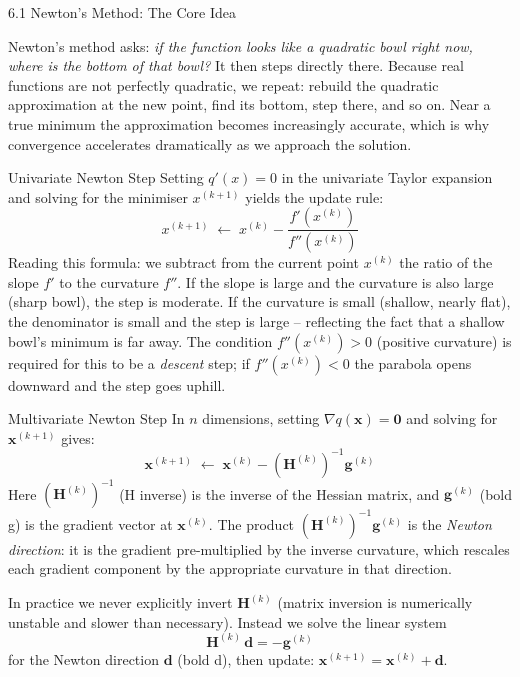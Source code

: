 \documentclass[aspectratio=169,10pt]{beamer}
\newcommand{\xbf}{\mathbf{x}}
\newcommand{\gbf}{\mathbf{g}}
\newcommand{\Hbf}{\mathbf{H}}
\begin{document}
\begin{frame}[allowframebreaks]{6.1 Newton's Method: The Core Idea}

  Newton's method asks: \emph{if the function looks like a quadratic bowl right
  now, where is the bottom of that bowl?}  It then steps directly there.  Because
  real functions are not perfectly quadratic, we repeat: rebuild the quadratic
  approximation at the new point, find its bottom, step there, and so on.  Near a
  true minimum the approximation becomes increasingly accurate, which is why
  convergence accelerates dramatically as we approach the solution.

  \begin{block}{Univariate Newton Step}
    Setting $q'(x) = 0$ in the univariate Taylor expansion and solving for the
    minimiser $x^{(k+1)}$ yields the update rule:
    \[
      x^{(k+1)} \;\leftarrow\; x^{(k)} - \frac{f'\!\left(x^{(k)}\right)}{f''\!\left(x^{(k)}\right)}
    \]
    Reading this formula: we subtract from the current point $x^{(k)}$ the ratio
    of the slope $f'$ to the curvature $f''$.  If the slope is large and the
    curvature is also large (sharp bowl), the step is moderate.  If the curvature
    is small (shallow, nearly flat), the denominator is small and the step is
    large -- reflecting the fact that a shallow bowl's minimum is far away.
    The condition $f''(x^{(k)}) > 0$ (positive curvature) is required for this
    to be a \emph{descent} step; if $f''(x^{(k)}) < 0$ the parabola opens
    downward and the step goes uphill.
  \end{block}

  \begin{block}{Multivariate Newton Step}
    In $n$ dimensions, setting $\nabla q(\xbf) = \mathbf{0}$ and solving for
    $\xbf^{(k+1)}$ gives:
    \[
      \xbf^{(k+1)} \;\leftarrow\; \xbf^{(k)} - \left(\Hbf^{(k)}\right)^{-1} \gbf^{(k)}
    \]
    Here $(\Hbf^{(k)})^{-1}$ (H inverse) is the inverse of the Hessian matrix,
    and $\gbf^{(k)}$ (bold g) is the gradient vector at $\xbf^{(k)}$.  The product
    $(\Hbf^{(k)})^{-1} \gbf^{(k)}$ is the \emph{Newton direction}: it is the
    gradient pre-multiplied by the inverse curvature, which rescales each gradient
    component by the appropriate curvature in that direction.

    In practice we never explicitly invert $\Hbf^{(k)}$ (matrix inversion is
    numerically unstable and slower than necessary).  Instead we solve the linear
    system
    \[
      \Hbf^{(k)}\,\mathbf{d} = -\gbf^{(k)}
    \]
    for the Newton direction $\mathbf{d}$ (bold d), then update:
    $\xbf^{(k+1)} = \xbf^{(k)} + \mathbf{d}$.
  \end{block}


\end{frame}
\end{document}
